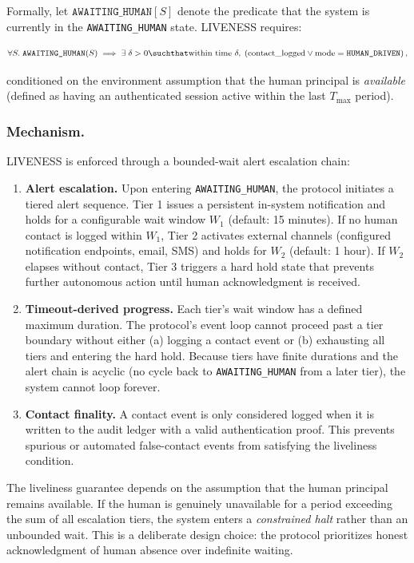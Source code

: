 Formally, let $\texttt{AWAITING\_HUMAN}[S]$ denote the predicate that the system is currently in the \texttt{AWAITING\_HUMAN} state. LIVENESS requires:

\[
\forall S.\; \texttt{AWAITING\_HUMAN}(S) \implies \exists\; \delta > 0 \suchthat \text{within time } \delta,\; \left( \text{contact\_logged} \lor \text{mode} = \texttt{HUMAN\_DRIVEN} \right),
\]

conditioned on the environment assumption that the human principal is \emph{available} (defined as having an authenticated session active within the last $T_{\max}$ period).

\subsubsection*{Mechanism.}
LIVENESS is enforced through a bounded-wait alert escalation chain:

\begin{enumerate}
    \item \textbf{Alert escalation.} Upon entering \texttt{AWAITING\_HUMAN}, the protocol initiates a tiered alert sequence. Tier 1 issues a persistent in-system notification and holds for a configurable wait window $W_1$ (default: 15 minutes). If no human contact is logged within $W_1$, Tier 2 activates external channels (configured notification endpoints, email, SMS) and holds for $W_2$ (default: 1 hour). If $W_2$ elapses without contact, Tier 3 triggers a hard hold state that prevents further autonomous action until human acknowledgment is received.
    \item \textbf{Timeout-derived progress.} Each tier's wait window has a defined maximum duration. The protocol's event loop cannot proceed past a tier boundary without either (a) logging a contact event or (b) exhausting all tiers and entering the hard hold. Because tiers have finite durations and the alert chain is acyclic (no cycle back to \texttt{AWAITING\_HUMAN} from a later tier), the system cannot loop forever.
    \item \textbf{Contact finality.} A contact event is only considered logged when it is written to the audit ledger with a valid authentication proof. This prevents spurious or automated false-contact events from satisfying the liveliness condition.
\end{enumerate}

The liveliness guarantee depends on the assumption that the human principal remains available. If the human is genuinely unavailable for a period exceeding the sum of all escalation tiers, the system enters a \emph{constrained halt} rather than an unbounded wait. This is a deliberate design choice: the protocol prioritizes honest acknowledgment of human absence over indefinite waiting.

